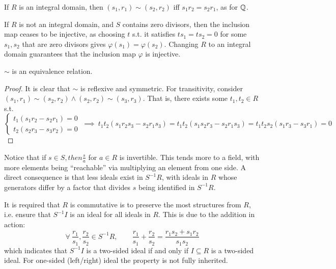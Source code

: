 \documentclass{article}
\begin{document}
\begin{remark}\upshape
    If $R$ is an integral domain, then $(s_1, r_1) \sim (s_2, r_2)$ iff $s_1 r_2 = s_2 r_1$, as for $\mathbb{Q}$.
\end{remark}

\begin{remark}
    If $R$ is not an integral domain, and $S$ contains zero divisors, then the inclusion map ceases to be injective, as choosing $t$ s.t. it satisfies $ts_1 = ts_2 = 0$ for some $s_1, s_2$ that are zero divisors gives $\varphi(s_1) = \varphi(s_2)$. Changing $R$ to an integral domain guarantees that the inclusion map $\varphi$ is injective.
\end{remark}

\begin{proposition}
    $\sim$ is an equivalence relation.
\end{proposition}

\begin{proof}
    It is clear that $\sim$ is reflexive and symmetric. For transitivity, consider $(s_1, r_1)\sim (s_2, r_2) \wedge (s_2, r_2)\sim (s_3, r_3)$. That is, there exists some $t_1, t_2\in R$ s.t. 
    \[
        \begin{cases}
            t_1 (s_1 r_2 - s_2 r_1) = 0 \\ t_2 (s_2 r_3 - s_3 r_2) = 0 
        \end{cases}
        \ \implies\ t_1 t_2 (s_1 r_2 s_3 - s_2 r_1 s_3) = t_1 t_2 (s_1 s_2 r_3 - s_2 r_1 s_3) = t_1 t_2 s_2 (s_1 r_3 - s_3 r_1) = 0
    \]
\end{proof}

\begin{remark}
    Notice that if $s\in S, then \frac{s}{a}$ for $a\in R$ is invertible. This tends more to a field, with more elements being ``reachable'' via multiplying an element from one side. A direct consequence is that less ideals exist in $S^{-1}R$, with ideals in $R$ whose generators differ by a factor that divides $s$ being identified in $S^{-1}R$. 
\end{remark}

\begin{remark}
    It is required that $R$ is commutative is to preserve the most structures from $R$, i.e. ensure that $S^{-1}I$ is an ideal for all ideals in $R$. This is due to the addition in action:
    \[
        \forall\ \frac{r_1}{s_1}, \frac{r_2}{s_2} \in S^{-1}R, \qquad \frac{r_1}{s_1} + \frac{r_2}{s_2} = \frac{r_1 s_2 + s_1 r_2}{s_1 s_2} 
    \]
    which indicates that $S^{-1}I$ is a two-sided ideal if and only if $I\subseteq R$ is a two-sided ideal. For one-sided (left/right) ideal the property is not fully inherited. 
\end{remark}
\end{document}
